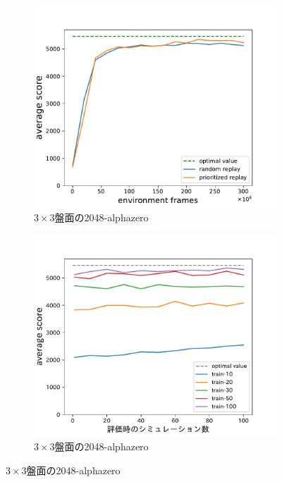 \begin{figure}
    \begin{subfigure}[T]{0.5\columnwidth}
        \centering
        \includegraphics[width=\columnwidth]{figures/alphazero_3x3.pdf}
        \caption{$3\times3$盤面の2048-alphazero}
        \label{fig:mini2048_alphazero}
    \end{subfigure}
    \begin{subfigure}[T]{0.5\columnwidth}
        \centering
        \includegraphics[width=\columnwidth]{figures/3x3_2048_alphazero_simulations.pdf}
        \caption{$3\times3$盤面の2048-alphazero}
        \label{fig:mini2048_alphazero_simulations}
    \end{subfigure}
\end{figure}

